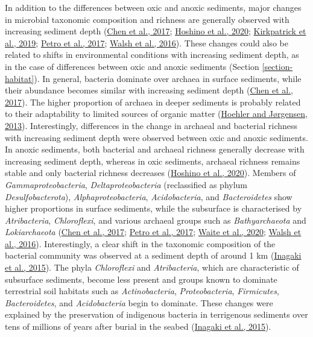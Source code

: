 \documentclass[
  12 pt,
]{book}
\begin{document}
In addition to the differences between oxic and anoxic sediments, major changes in microbial taxonomic composition and richness are generally observed with increasing sediment depth (\protect\hyperlink{ref-Chen2017}{Chen et al., 2017}; \protect\hyperlink{ref-Hoshino2020}{Hoshino et al., 2020}; \protect\hyperlink{ref-Kirkpatrick2019}{Kirkpatrick et al., 2019}; \protect\hyperlink{ref-Petro2017}{Petro et al., 2017}; \protect\hyperlink{ref-Walsh2016a}{Walsh et al., 2016}). These changes could also be related to shifts in environmental conditions with increasing sediment depth, as in the case of differences between oxic and anoxic sediments (Section \ref{section-habitat}). In general, bacteria dominate over archaea in surface sediments, while their abundance becomes similar with increasing sediment depth (\protect\hyperlink{ref-Chen2017}{Chen et al., 2017}). The higher proportion of archaea in deeper sediments is probably related to their adaptability to limited sources of organic matter (\protect\hyperlink{ref-Hoehler2013}{Hoehler and Jørgensen, 2013}). Interestingly, differences in the change in archaeal and bacterial richness with increasing sediment depth were observed between oxic and anoxic sediments. In anoxic sediments, both bacterial and archaeal richness generally decrease with increasing sediment depth, whereas in oxic sediments, archaeal richness remains stable and only bacterial richness decreases (\protect\hyperlink{ref-Hoshino2020}{Hoshino et al., 2020}). Members of \emph{Gammaproteobacteria}, \emph{Deltaproteobacteria} (reclassified as phylum \emph{Desulfobacterota}), \emph{Alphaproteobacteria}, \emph{Acidobacteria}, and \emph{Bacteroidetes} show higher proportions in surface sediments, while the subsurface is characterised by \emph{Atribacteria}, \emph{Chloroflexi}, and various archaeal groups such as \emph{Bathyarchaeota} and \emph{Lokiarchaeota} (\protect\hyperlink{ref-Chen2017}{Chen et al., 2017}; \protect\hyperlink{ref-Petro2017}{Petro et al., 2017}; \protect\hyperlink{ref-Waite2020}{Waite et al., 2020}; \protect\hyperlink{ref-Walsh2016a}{Walsh et al., 2016}). Interestingly, a clear shift in the taxonomic composition of the bacterial community was observed at a sediment depth of around 1 \si{\km} (\protect\hyperlink{ref-Inagaki2015}{Inagaki et al., 2015}). The phyla \emph{Chloroflexi} and \emph{Atribacteria}, which are characteristic of subsurface sediments, become less present and groups known to dominate terrestrial soil habitats such as \emph{Actinobacteria}, \emph{Proteobacteria}, \emph{Firmicutes}, \emph{Bacteroidetes}, and \emph{Acidobacteria} begin to dominate. These changes were explained by the preservation of indigenous bacteria in terrigenous sediments over tens of millions of years after burial in the seabed (\protect\hyperlink{ref-Inagaki2015}{Inagaki et al., 2015}).
\end{document}
